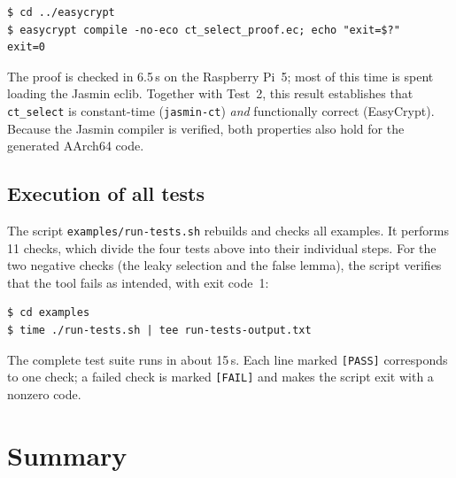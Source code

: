 \documentclass[11pt,a4paper]{article}
\newcommand{\file}[1]{\texttt{#1}}
\begin{document}


\begin{lstlisting}[style=shell]
$ cd ../easycrypt
$ easycrypt compile -no-eco ct_select_proof.ec; echo "exit=$?"
exit=0
\end{lstlisting}

The proof is checked in 6.5\,s on the Raspberry Pi~5; most of this time is
spent loading the Jasmin eclib. Together with Test~2, this result
establishes that \texttt{ct\_select} is constant-time (\texttt{jasmin-ct})
\emph{and} functionally correct (EasyCrypt). Because the Jasmin compiler is
verified, both properties also hold for the generated AArch64 code.

\subsection{Execution of all tests}
\label{sec:script}

The script \file{examples/run-tests.sh} rebuilds and checks all examples. It
performs 11 checks, which divide the four tests above into their individual
steps. For the two negative checks (the leaky selection and the false
lemma), the script verifies that the tool fails as intended, with exit
code~1:



\begin{lstlisting}[style=shell]
$ cd examples
$ time ./run-tests.sh | tee run-tests-output.txt
\end{lstlisting}



The complete test suite runs in about 15\,s. Each line marked
\texttt{[PASS]} corresponds to one check; a failed check is marked
\texttt{[FAIL]} and makes the script exit with a nonzero code.

\section{Summary}
\end{document}
